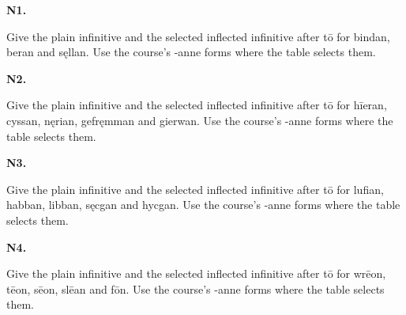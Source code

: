 \par\begin{minipage}{\linewidth}\raggedright
\textbf{N1.}

Give the plain infinitive and the selected inflected infinitive after tō for bindan, beran and sęllan. Use the course’s -anne forms where the table selects them.

\end{minipage}\par\addvspace{4pt}

\par\begin{minipage}{\linewidth}\raggedright
\textbf{N2.}

Give the plain infinitive and the selected inflected infinitive after tō for hīeran, cyssan, nęrian, gefręmman and gierwan. Use the course’s -anne forms where the table selects them.

\end{minipage}\par\addvspace{4pt}

\par\begin{minipage}{\linewidth}\raggedright
\textbf{N3.}

Give the plain infinitive and the selected inflected infinitive after tō for lufian, habban, libban, sęcgan and hycgan. Use the course’s -anne forms where the table selects them.

\end{minipage}\par\addvspace{4pt}

\par\begin{minipage}{\linewidth}\raggedright
\textbf{N4.}

Give the plain infinitive and the selected inflected infinitive after tō for wrēon, tēon, sēon, slēan and fōn. Use the course’s -anne forms where the table selects them.

\end{minipage}\par\addvspace{4pt}

